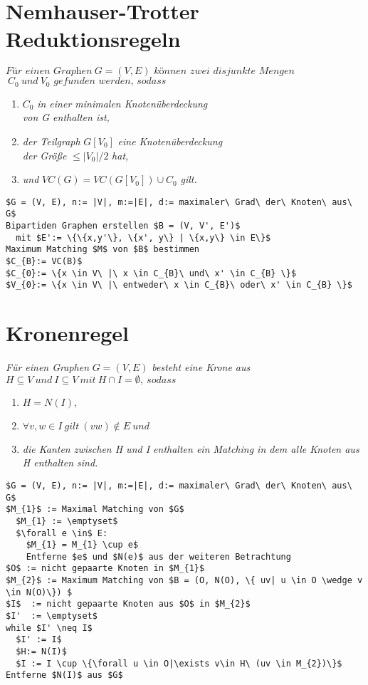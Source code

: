 \section{Nemhauser-Trotter Reduktionsregeln}
\label{ch:Grundlagen:sec:Nemhauser-Trotter Reduktionsregeln}
$\textit{Für einen Graphen}\ G=(V,E)\textit{ können zwei disjunkte Mengen}$\\ $\ C_{0}\ und\ V_{0} \textit{ gefunden werden, sodass}$
\begin{enumerate}
\item $C_{0}$ \textit{ in einer minimalen Knotenüberdeckung} \\
\textit{von G enthalten ist,}
\item \textit{der Teilgraph }$G[V_{0}]$ \textit{eine Knotenüberdeckung}\\
\textit{der Größe} $\leq |V_{0}| / 2$ \textit{ hat,}
\item \textit{und} $VC(G) = VC(G[V_{0}])\cup C_{0}$ \textit{ gilt.}
\end{enumerate}

\begin{lstlisting}[mathescape = true, basicstyle=\ttfamily]
$G = (V, E), n:= |V|, m:=|E|, d:= maximaler\ Grad\ der\ Knoten\ aus\ G$
Bipartiden Graphen erstellen $B = (V, V', E')$ 
  mit $E':= \{\{x,y'\}, \{x', y\} | \{x,y\} \in E\}$ 
Maximum Matching $M$ von $B$ bestimmen 
$C_{B}:= VC(B)$ 
$C_{0}:= \{x \in V\ |\ x \in C_{B}\ und\ x' \in C_{B} \}$ 
$V_{0}:= \{x \in V\ |\ entweder\ x \in C_{B}\ oder\ x' \in C_{B} \}$ 
\end{lstlisting}
\section{Kronenregel}
\label{ch:Grundlagen:sec:Kronenregel}

\textit{Für einen Graphen} $G=(V,E)$ \textit{besteht eine Krone aus} $H \subseteq V\ und\ I \subseteq V\ mit\ H \cap I = \emptyset,\ sodass$ 
\begin{enumerate}
\item $H = N(I),$ 
\item $\forall v, w \in I\ gilt\ (vw) \notin E\ und$
\item \textit{die Kanten zwischen H und I enthalten ein Matching in dem alle Knoten aus H enthalten sind.}
\end{enumerate}


\begin{lstlisting}[mathescape=true, escapechar = !,basicstyle=\ttfamily]
$G = (V, E), n:= |V|, m:=|E|, d:= maximaler\ Grad\ der\ Knoten\ aus\ G$
$M_{1}$ := Maximal Matching von $G$
  $M_{1} := \emptyset$
  $\forall e \in$ E:
    $M_{1} = M_{1} \cup e$
    Entferne $e$ und $N(e)$ aus der weiteren Betrachtung
$O$ := nicht gepaarte Knoten in $M_{1}$
$M_{2}$ := Maximum Matching von $B = (O, N(O), \{ uv| u \in O \wedge v \in N(O)\}) $
$I$  := nicht gepaarte Knoten aus $O$ in $M_{2}$
$I'  := \emptyset$
while $I' \neq I$
  $I' := I$
  $H:= N(I)$
  $I := I \cup \{\forall u \in O|\exists v\in H\ (uv \in M_{2})\}$
Entferne $N(I)$ aus $G$
\end{lstlisting}


